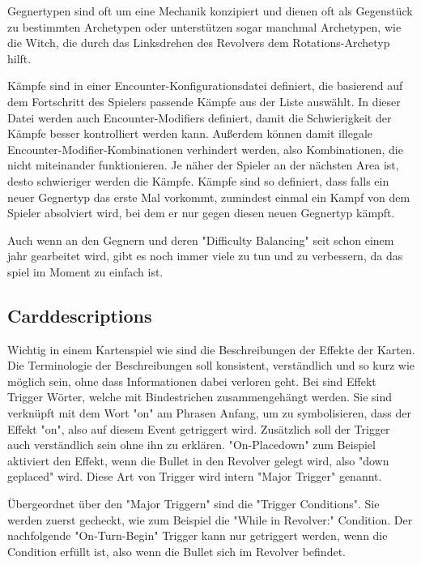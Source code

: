 Gegnertypen sind oft um eine Mechanik konzipiert und dienen oft als Gegenstück zu bestimmten Archetypen oder unterstützen
sogar manchmal Archetypen, wie \zB die Witch, die durch das Linksdrehen des Revolvers dem Rotations-Archetyp hilft.


Kämpfe sind in einer Encounter-Konfigurationsdatei definiert, die basierend auf dem Fortschritt des Spielers passende
Kämpfe aus der Liste auswählt. In dieser Datei werden auch Encounter-Modifiers definiert, damit die Schwierigkeit
der Kämpfe besser kontrolliert werden kann. Außerdem können damit illegale Encounter-Modifier-Kombinationen verhindert
werden, also Kombinationen, die nicht miteinander funktionieren. Je näher der Spieler an der nächsten Area ist,
desto schwieriger werden die Kämpfe. Kämpfe sind so definiert, dass falls ein neuer Gegnertyp das erste Mal vorkommt,
zumindest einmal ein Kampf von dem Spieler absolviert wird, bei dem er nur gegen diesen neuen Gegnertyp kämpft.


Auch wenn an den Gegnern und deren "Difficulty Balancing" seit schon einem jahr gearbeitet wird, gibt es noch immer viele
zu tun und zu verbessern, da das spiel im Moment zu einfach ist.



\subsection{Carddescriptions}\label{subsec:placementMatters}

Wichtig in einem Kartenspiel wie \FF sind die Beschreibungen der Effekte der Karten. Die Terminologie der Beschreibungen
soll konsistent, verständlich und so kurz wie möglich sein, ohne dass Informationen dabei verloren geht. Bei \FF sind
Effekt Trigger Wörter, welche mit Bindestrichen zusammengehängt werden. Sie sind verknüpft mit dem Wort "on" am Phrasen Anfang, um zu symbolisieren,
dass der Effekt "on", also auf diesem Event getriggert wird. Zusätzlich soll der Trigger auch verständlich sein ohne ihn zu erklären.
"On-Placedown" zum Beispiel aktiviert den Effekt, wenn die Bullet in den Revolver gelegt wird, also "down geplaced" wird.
Diese Art von Trigger wird intern "Major Trigger" genannt.


Übergeordnet über den "Major Triggern" sind die "Trigger Conditions". Sie werden zuerst gecheckt, wie zum Beispiel die "While in Revolver:" Condition.
Der nachfolgende "On-Turn-Begin" Trigger kann nur getriggert werden, wenn die Condition erfüllt ist, also wenn die Bullet sich im Revolver befindet. %


